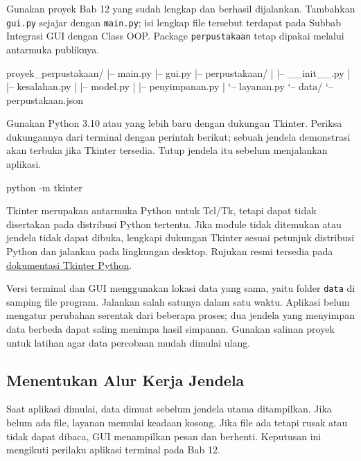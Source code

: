 Gunakan proyek Bab 12 yang sudah lengkap dan berhasil dijalankan. Tambahkan \texttt{gui.py} sejajar dengan \texttt{main.py}; isi lengkap file tersebut terdapat pada Subbab Integrasi GUI dengan Class OOP. Package \texttt{perpustakaan} tetap dipakai melalui antarmuka publiknya.

\begin{keluaran}
proyek_perpustakaan/
|-- main.py
|-- gui.py
|-- perpustakaan/
|   |-- __init__.py
|   |-- kesalahan.py
|   |-- model.py
|   |-- penyimpanan.py
|   `-- layanan.py
`-- data/
    `-- perpustakaan.json
\end{keluaran}

Gunakan Python 3.10 atau yang lebih baru dengan dukungan Tkinter. Periksa dukungannya dari terminal dengan perintah berikut; sebuah jendela demonstrasi akan terbuka jika Tkinter tersedia. Tutup jendela itu sebelum menjalankan aplikasi.

\begin{keluaran}
python -m tkinter
\end{keluaran}

Tkinter merupakan antarmuka Python untuk Tcl/Tk, tetapi dapat tidak disertakan pada distribusi Python tertentu. Jika module tidak ditemukan atau jendela tidak dapat dibuka, lengkapi dukungan Tkinter sesuai petunjuk distribusi Python dan jalankan pada lingkungan desktop. Rujukan resmi tersedia pada \href{https://docs.python.org/3.12/library/tkinter.html}{dokumentasi Tkinter Python}.

\begin{penting}
Versi terminal dan GUI menggunakan lokasi data yang sama, yaitu folder \texttt{data} di samping file program. Jalankan salah satunya dalam satu waktu. Aplikasi belum mengatur perubahan serentak dari beberapa proses; dua jendela yang menyimpan data berbeda dapat saling menimpa hasil simpanan. Gunakan salinan proyek untuk latihan agar data percobaan mudah dimulai ulang.
\end{penting}

\subsection{Menentukan Alur Kerja Jendela}

Saat aplikasi dimulai, data dimuat sebelum jendela utama ditampilkan. Jika belum ada file, layanan memulai keadaan kosong. Jika file ada tetapi rusak atau tidak dapat dibaca, GUI menampilkan pesan dan berhenti. Keputusan ini mengikuti perilaku aplikasi terminal pada Bab 12.

